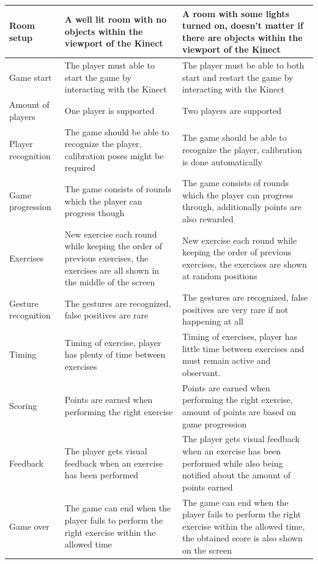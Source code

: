 \documentclass[11pt]{report}
\begin{document}
\begin{center}
\begin{longtable}{| p{3cm} | p{4.75cm} | p{6cm} | }
\hline
Room setup & A well lit room with no objects within the viewport of the Kinect & A room with some lights turned on, doesn't matter if there are objects within the viewport of the Kinect \\ \hline
Game start & The player must able to start the game by interacting with the Kinect & The player must be able to both start and restart the game by interacting with the Kinect \\ \hline
Amount of players & One player is supported & Two players are supported \\ \hline
Player recognition & The game should be able to recognize the player, calibration poses might be required & The game should be able to recognize the player, calibration is done automatically \\ \hline
Game progression & The game consists of rounds which the player can progress though & The game consists of rounds which the player can progress through, additionally points are also rewarded \\ \hline
Exercises & New exercise each round while keeping the order of previous exercises, the exercises are all shown in the middle of the screen & New exercise each round while keeping the order of previous exercises, the exercises are shown at random positions \\ \hline
Gesture recognition & The gestures are recognized, false positives are rare & The gestures are recognized, false positives are very rare if not happening at all \\ \hline
Timing & Timing of exercise, player has plenty of time between exercises & Timing of exercises, player has little time between exercises and must remain active and observant. \\ \hline
Scoring & Points are earned when performing the right exercise & Points are earned when performing the right exercise, amount of points are based on game progression \\ \hline
Feedback & The player gets visual feedback when an exercise has been performed & The player gets visual feedback when an exercise has been performed while also being notified about the amount of points earned \\ \hline
Game over & The game can end when the player fails to perform the right exercise within the allowed time & The game can end when the player fails to perform the right exercise within the allowed time, the obtained score is also shown on the screen \\ \hline
\end{longtable}
\end{center}
\end{document}
